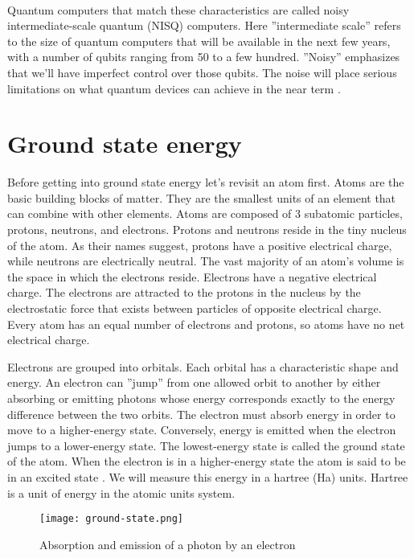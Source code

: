 \paragraph{}
Quantum computers that match these characteristics are called noisy intermediate-scale quantum (NISQ) computers. Here ''intermediate scale'' refers to the size of quantum computers that will be available in the next few years, with a number of qubits ranging from 50 to a few hundred. ''Noisy'' emphasizes that we'll have imperfect control over those qubits. The noise will place serious limitations on what quantum devices can achieve in the near term \cite{preskill_nisq}.


\section{Ground state energy}
Before getting into ground state energy let's revisit an atom first. Atoms are the basic building blocks of matter. They are the smallest units of an element that can combine with other elements. Atoms are composed of 3 subatomic particles, protons, neutrons, and electrons. Protons and neutrons reside in the tiny nucleus of the atom. As their names suggest, protons have a positive electrical charge, while neutrons are electrically neutral. The vast majority of an atom's volume is the space in which the electrons reside. Electrons have a negative electrical charge. The electrons are attracted to the protons in the nucleus by the electrostatic force that exists between particles of opposite electrical charge. Every atom has an equal number of electrons and protons, so atoms have no net electrical charge.

Electrons are grouped into orbitals. Each orbital has a characteristic shape and energy. An electron can ''jump'' from one allowed orbit to another by either absorbing or emitting photons whose energy corresponds exactly to the energy difference between the two orbits. The electron must absorb energy in order to move to a higher-energy state. Conversely, energy is emitted when the electron jumps to a lower-energy state. The lowest-energy state is called the ground state of the atom. When the electron is in a higher-energy state the atom is said to be in an excited state \cite{chemistry}. We will measure this energy in a hartree (Ha) units. Hartree is a unit of energy in the atomic units system.~\cite{hartree}

\begin{figure}[H]
    \centering
    \texttt{[image: ground-state.png]}
    \caption{Absorption and emission of a photon by an electron~\cite{ground-state-picture}}
\end{figure}


